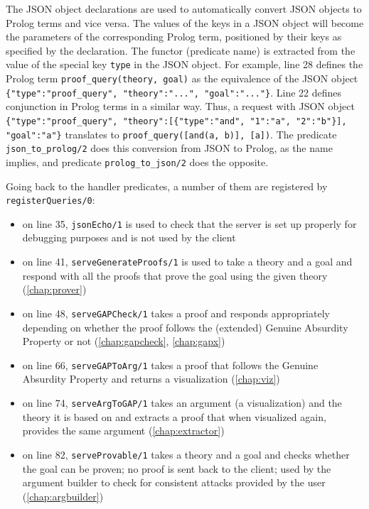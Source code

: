 \documentclass[11pt,twoside,a4paper]{report}
\begin{document}
The JSON object declarations are used to automatically convert JSON objects to Prolog terms and vice versa. The values of the keys in a JSON object will become the parameters of the corresponding Prolog term, positioned by their keys as specified by the declaration. The functor (predicate name) is extracted from the value of the special key \lstinline$type$ in the JSON object. For example, line 28 defines the Prolog term \lstinline$proof_query(theory, goal)$ as the equivalence of the JSON object \lstinline${"type":"proof_query", "theory":"...", "goal":"..."}$. Line 22 defines conjunction in Prolog terms in a similar way. Thus, a request with JSON object \lstinline${"type":"proof_query", "theory":[{"type":"and", "1":"a", "2":"b"}], "goal":"a"}$ translates to \lstinline$proof_query([and(a, b)], [a])$. The predicate \lstinline$json_to_prolog/2$ does this conversion from JSON to Prolog, as the name implies, and predicate \lstinline$prolog_to_json/2$ does the opposite.

Going back to the handler predicates, a number of them are registered by \lstinline$registerQueries/0$:
\begin{itemize}
\item
on line 35, \lstinline$jsonEcho/1$ is used to check that the server is set up properly for debugging purposes and is not used by the client
\item
on line 41, \lstinline$serveGenerateProofs/1$ is used to take a theory and a goal and respond with all the proofs that prove the goal using the given theory (\autoref{chap:prover})
\item
on line 48, \lstinline$serveGAPCheck/1$ takes a proof and responds appropriately depending on whether the proof follows the (extended) Genuine Absurdity Property or not (\autoref{chap:gapcheck}, \autoref{chap:gapx})
\item
on line 66, \lstinline$serveGAPToArg/1$ takes a proof that follows the Genuine Absurdity Property and returns a visualization (\autoref{chap:viz})
\item
on line 74, \lstinline$serveArgToGAP/1$ takes an argument (a visualization) and the theory it is based on and extracts a proof that when visualized again, provides the same argument (\autoref{chap:extractor})
\item
on line 82, \lstinline$serveProvable/1$ takes a theory and a goal and checks whether the goal can be proven; no proof is sent back to the client; used by the argument builder to check for consistent attacks provided by the user (\autoref{chap:argbuilder})
\end{itemize} 
\end{document}

